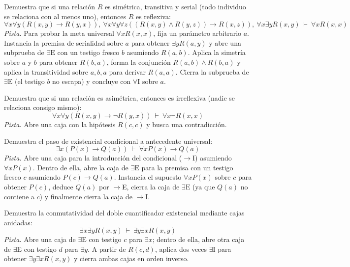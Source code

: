 \begin{pregunta}\label{e4-12}
Demuestra que si una relación $R$ es simétrica, transitiva y serial (todo individuo se relaciona con al menos uno), entonces $R$ es reflexiva:
\[
\forall x \forall y (R(x, y) \to R(y, x)), \ \forall x \forall y \forall z ((R(x, y) \land R(y, z)) \to R(x, z)), \ \forall x \exists y R(x, y) \ \vdash \ \forall x R(x, x)
\]
\textit{Pista.} Para probar la meta universal $\forall x R(x, x)$, fija un parámetro arbitrario $a$. Instancia la premisa de serialidad sobre $a$ para obtener $\exists y R(a, y)$ y abre una subprueba de $\exists\text{E}$ con un testigo fresco $b$ asumiendo $R(a, b)$. Aplica la simetría sobre $a$ y $b$ para obtener $R(b, a)$, forma la conjunción $R(a, b) \land R(b, a)$ y aplica la transitividad sobre $a, b, a$ para derivar $R(a, a)$. Cierra la subprueba de $\exists\text{E}$ (el testigo $b$ no escapa) y concluye con $\forall\text{I}$ sobre $a$.
\end{pregunta}

\begin{pregunta}\label{e4-13}
Demuestra que si una relación es asimétrica, entonces es irreflexiva (nadie se relaciona consigo mismo):
\[
\forall x \forall y (R(x, y) \to \neg R(y, x)) \ \vdash \ \forall x \neg R(x, x)
\]
\textit{Pista.} Abre una caja con la hipótesis $R(c, c)$ y busca una contradicción.
\end{pregunta}

\begin{pregunta}\label{e4-14}
Demuestra el paso de existencial condicional a antecedente universal:
\[
\exists x (P(x) \to Q(a)) \ \vdash \ \forall x P(x) \to Q(a)
\]
\textit{Pista.} Abre una caja para la introducción del condicional ($\to$I) asumiendo $\forall x P(x)$. Dentro de ella, abre la caja de $\exists\text{E}$ para la premisa con un testigo fresco $c$ asumiendo $P(c) \to Q(a)$. Instancia el supuesto $\forall x P(x)$ sobre $c$ para obtener $P(c)$, deduce $Q(a)$ por $\to$E, cierra la caja de $\exists\text{E}$ (ya que $Q(a)$ no contiene a $c$) y finalmente cierra la caja de $\to$I.
\end{pregunta}

\begin{pregunta}\label{e4-15}
Demuestra la conmutatividad del doble cuantificador existencial mediante cajas anidadas:
\[
\exists x \exists y R(x, y) \ \vdash \ \exists y \exists x R(x, y)
\]
\textit{Pista.} Abre una caja de $\exists\text{E}$ con testigo $c$ para $\exists x$; dentro de ella, abre otra caja de $\exists\text{E}$ con testigo $d$ para $\exists y$. A partir de $R(c, d)$, aplica dos veces $\exists\text{I}$ para obtener $\exists y \exists x R(x, y)$ y cierra ambas cajas en orden inverso.
\end{pregunta}


